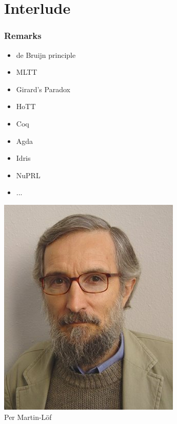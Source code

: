 \documentclass[xetex]{beamer}
\begin{document}
\section{Interlude}

\begin{frame}
  \frametitle{Remarks}
  


    \begin{minipage}{.45\textwidth}
      \begin{itemize}
        \item de Bruijn principle
        \item MLTT
        \item Girard's Paradox
        \item HoTT
        \item Coq
        \item Agda
        \item Idris
        \item NuPRL
        \item ...
      \end{itemize}
    \end{minipage}
    \begin{minipage}{.45\textwidth}
      \begin{center}
      \includegraphics[scale=0.3]{Martinlof}
      \\ Per Martin-L\"of
      \end{center}
    \end{minipage}
\end{frame}
\end{document}
